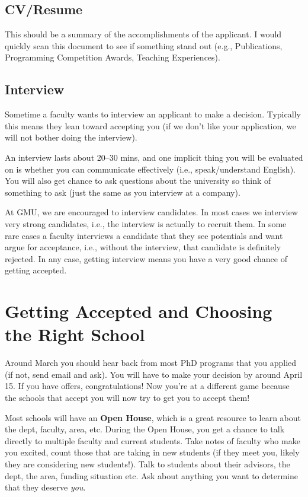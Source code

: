 \documentclass[10pt]{article}
\begin{document}
\subsection{CV/Resume}
This should be a summary of the accomplishments of the applicant.  I would quickly scan this document to see if something stand out (e.g., Publications, Programming Competition Awards, Teaching Experiences).

\subsection{Interview}

Sometime a faculty wants to interview an applicant to make a decision. Typically this means they lean toward accepting you (if we don't like your application, we will not bother doing the interview).

An interview lasts about 20--30 mins, and one implicit thing you will be evaluated on is whether you can communicate effectively (i.e., speak/understand English).  You will also get chance to ask questions about the university so think of something to ask (just the same as you interview at a company).

\begin{tcolorbox}[left=1pt,right=1pt,top=1pt,bottom=1pt]
At GMU, we are encouraged to interview candidates. In most cases we interview very strong candidates, i.e., the interview is actually to recruit them.  In some rare cases a faculty interviews a candidate that they see potentials and want argue for acceptance, i.e., without the interview, that candidate is definitely rejected. In any case, getting interview means you have a very good chance of getting accepted.
\end{tcolorbox}

\section{Getting Accepted and Choosing the Right School}

Around March you should hear back from most PhD programs that you applied (if not, send email and ask). You will have to make your decision by around April 15.
If you have offers, congratulations!  Now you're at a different game because the schools that accept you will now try to get you to accept them!  

Most schools will have an \textbf{Open House}, which is a great resource to learn about the dept, faculty, area, etc. During the Open House, you get a chance to talk directly to multiple faculty and current students.  Take notes of faculty who make you excited, count those that are taking in new students (if they meet you, likely they are considering new students!).  Talk to students about their advisors, the dept, the area, funding situation etc.  Ask about anything you want to determine that they deserve \emph{you}.
\end{document}
